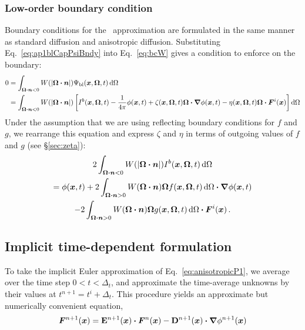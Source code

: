 \subsubsection{Low-order boundary condition}
Boundary conditions for the \APone\ approximation are formulated in the same
manner as standard diffusion and anisotropic diffusion.
Substituting Eq.~\eqref{eq:ap1blCapPsiBndy} into Eq.~\eqref{eq:bcW} gives a
condition to enforce on the boundary:
\begin{align*}
  0 &= \int_{\bm{\Omega} \bm{\cdot} \bm{n} < 0} W(\left| \bm{\Omega} \bm{\cdot} \bm{n} \right|)
  \Psi_\mathrm{bl} (\bm{x}, \bm{\Omega}, t) \mathop{}\!\mathrm{d}\Omega
  \\
  &= \int_{\bm{\Omega} \bm{\cdot} \bm{n} < 0} W(\left| \bm{\Omega} \bm{\cdot} \bm{n} \right|)
 \left[ I^b(\bm{x}, \bm{\Omega}, t) - \frac{1}{4\pi} \phi(\bm{x}, t)
  + \zeta(\bm{x}, \bm{\Omega}, t) \bm{\Omega}\bm{\cdot} \bm{\nabla} \phi(\bm{x}, t)
  - \eta(\bm{x}, \bm{\Omega}, t) \bm{\Omega}\bm{\cdot} \bm{F}^i(\bm{x})\right]
  \mathop{}\!\mathrm{d}\Omega
\end{align*}
Under the assumption that we are using reflecting boundary conditions for $f$
and $g$, we rearrange this equation and express $\zeta$ and $\eta$ in terms of
outgoing values of $f$ and $g$ (see \S\ref{sec:zeta}):
\begin{multline}\label{eq:ap1loBndy}
  2 \int_{\bm{\Omega} \bm{\cdot} \bm{n} < 0} W(\left| \bm{\Omega} \bm{\cdot} \bm{n} \right|)
  I^b(\bm{x}, \bm{\Omega}, t) \mathop{}\!\mathrm{d}\Omega
  \\
  =
 \phi(\bm{x}, t)
  + 2\int_{\bm{\Omega}\bm{\cdot} \bm{n} > 0} W(\bm{\Omega} \bm{\cdot} \bm{n})
  \bm{\Omega} f(\bm{x}, \bm{\Omega},t) \mathop{}\!\mathrm{d}\Omega
  \bm{\cdot} \bm{\nabla} \phi(\bm{x}, t) 
  \\
  - 2\int_{\bm{\Omega}\bm{\cdot} \bm{n} > 0} W(\bm{\Omega} \bm{\cdot} \bm{n})
  \bm{\Omega} g(\bm{x}, \bm{\Omega},t) \mathop{}\!\mathrm{d}\Omega
  \bm{\cdot} \bm{F}^i(\bm{x}) 
  \,.
\end{multline}

\subsection{Implicit time-dependent formulation}
To take the implicit Euler approximation of Eq.~\eqref{eq:anisotropicP1}, we
average over the time step $0 < t < \Delta_t$, and approximate the
time-average unknowns by their values at $t^{n+1} = t^i + \Delta_t$. This
procedure yields an approximate but numerically convenient equation,
\begin{equation}\label{eq:implicitFlux1}
  \bm{F}^{n+1}(\bm{x}) = \mathbf{E}^{n+1} (\bm{x}) \bm{\cdot} \bm{F}^n(\bm{x})
  - \mathbf{D}^{n+1}(\bm{x}) \bm{\cdot} \bm{\nabla} \phi^{n+1} (\bm{x}) 
\end{equation}

